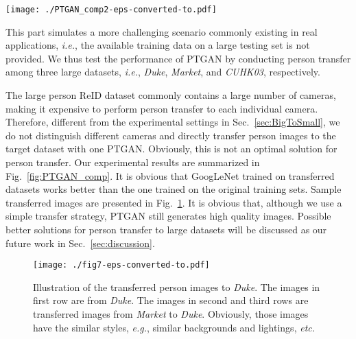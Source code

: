 \documentclass[10pt,twocolumn,letterpaper]{article}
\begin{document}
\begin{figure*}[ht!]
    \begin{center}
    \texttt{[image: ./PTGAN\_comp2-eps-converted-to.pdf]}
    \end{center}
    \caption{Rank-1 and Rank-10 accuracies of GoogLeNet on \emph{CUHK03}, \emph{Market}, and \emph{Duke}. The subscripts ${C}$, ${Ma}$, and ${D}$ denote the transferred target dataset is \emph{CUHK03}, \emph{Market}, and \emph{Duke}, respectively. }
    \label{fig:PTGAN_comp}
\end{figure*}



This part simulates a more challenging scenario commonly existing in real applications, \emph{i.e.}, the available training data on a large testing set is not provided. We thus test the performance of PTGAN by conducting person transfer among three large datasets, \emph{i.e.}, \emph{Duke}, \emph{Market}, and \emph{CUHK03}, respectively.

The large person ReID dataset commonly contains a large number of cameras, making it expensive to perform person transfer to each individual camera. Therefore, different from the experimental settings in Sec.~\ref{sec:BigToSmall}, we do not distinguish different cameras and directly transfer person images to the target dataset with one PTGAN. Obviously, this is not an optimal solution for person transfer. Our experimental results are summarized in Fig.~\ref{fig:PTGAN_comp}.
It is obvious that GoogLeNet trained on transferred datasets works better than the one trained on the original training sets. Sample transferred images are presented in Fig.~\ref{fig:fig7}. It is obvious that, although we use a simple transfer strategy, PTGAN still generates high quality images. Possible better solutions for person transfer to large datasets will be discussed as our future work in Sec.~\ref{sec:discussion}.

\begin{figure}
\begin{center}
\texttt{[image: ./fig7-eps-converted-to.pdf]}
\vspace{-2mm}
\end{center}
\caption{Illustration of the transferred person images to \emph{Duke}. The images in first row are from \emph{Duke}. The images in second and third rows are transferred images from \emph{Market} to \emph{Duke}. Obviously, those images have the similar styles, \emph{ e.g.}, similar backgrounds and lightings, \emph{etc.}}
\label{fig:fig7}
\end{figure}
\end{document}
